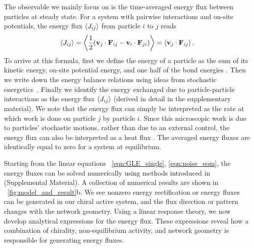 \documentclass[
 preprint,
 preprintnumbers,
 amsmath,amssymb,
 aps,
 pre,
 longbibliography,
 superscriptaddress,
 10pt, twocolumn
]{revtex4-1}
\begin{document}
The observable we mainly focus on is the time-averaged energy flux between particles at steady state. For a system with pairwise interactions and on-site potentials, the energy flux $\expval{J_{ij}}$ from particle $i$ to $j$ reads
\begin{equation} \label{eqn:flux_def}
    \expval{J_{ij}} = \expval{\frac{1}{2} (\mathbf{v}_j \cdot \mathbf{F}_{ij} - \mathbf{v}_i \cdot \mathbf{F}_{ji})}
    = \expval{\mathbf{v}_j \cdot \mathbf{F}_{ij}}.
\end{equation}
To arrive at this formula, first we define the energy of a particle as the sum of its kinetic energy, on-site potential energy, and one half of the bond energies \cite{Lepri2003ThermalConduction}. Then we write down the energy balance relations using ideas from stochastic energetics~\cite{Sekimoto1998LangevinEquation}. Finally we identify the energy exchanged due to particle-particle interactions as the energy flux $\expval{J_{ij}}$ (derived in detail in the supplementary material).
We note that the energy flux can simply be interpreted as the rate at which work is done on particle $j$ by particle $i$.
Since this microscopic work is due to particles' stochastic motions, rather than due to an external control, the energy flux can also be interpreted as a heat flux \cite{Sekimoto1998LangevinEquation,Lepri2003ThermalConduction}. The averaged energy fluxes are identically equal to zero for a system at equilibrium.

Starting from the linear equations \eqnname~\eqref{eqn:GLE_single}, \eqref{eqn:noise_eom}, the energy fluxes can be solved numerically using methods introduced in \cite{Gardiner2009ItoCalculus,Ceriotti2010ColoredNoiseThermostats} (Supplemental Material).
A collection of numerical results are shown in \figurename~\ref{fig:model_and_result}b. We see nonzero energy rectification or energy fluxes can be generated in our chiral active system, and the flux direction or pattern changes with the network geometry.
Using a linear response theory, we now develop analytical expressions for the energy flux. These expressions reveal how a combination of chirality, non-equilibrium activity, and network geometry is responsible for generating energy fluxes.
\end{document}
